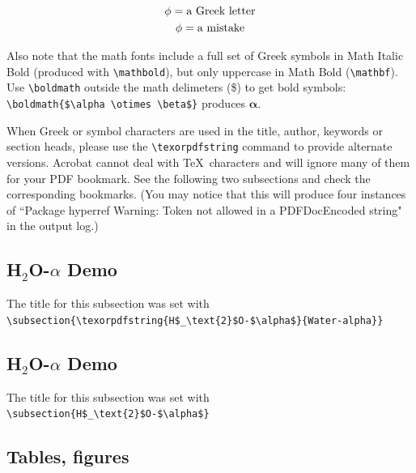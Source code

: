 \begin{gather}
\phi = \text{a Greek letter}\\
{\rm \phi} = \text{a mistake}\\
\end{gather}

Also note that the math fonts include a full set of Greek symbols in Math Italic Bold (produced with \verb|\mathbold|),
but only uppercase in Math Bold (\verb|\mathbf|). Use \verb|\boldmath| outside the math delimeters (\$) to get bold symbols: \verb|\boldmath{$\alpha \otimes \beta$}| produces \boldmath{$\alpha \otimes \beta$} $\boldsymbol{\alpha}$.

When Greek or symbol characters are used in the title, author,
keywords or section heads, please use the \verb|\texorpdfstring|
command to provide alternate versions. Acrobat cannot deal with
\TeX\ characters and will ignore many of them for your PDF bookmark. See the following two subsections and check the corresponding bookmarks. (You may notice that this will produce four instances of ``Package hyperref Warning: Token not allowed in a PDFDocEncoded string" in the output log.)

\subsection{\texorpdfstring{H$_\text{2}$O-$\alpha$}{Water-alpha} Demo}
The title for this subsection was set with \\
\verb|\subsection{\texorpdfstring{H$_\text{2}$O-$\alpha$}{Water-alpha}}|

\subsection{H$_\text{2}$O-$\alpha$ Demo}
The title for this subsection was set with\\
\verb|\subsection{H$_\text{2}$O-$\alpha$}|



\subsection{Tables, figures}

